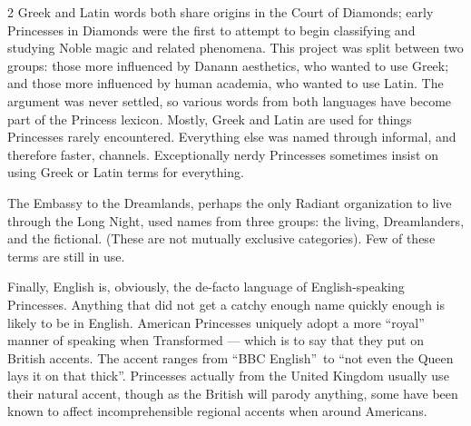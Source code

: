 \begin{multicols}{2}
Greek and Latin words both share origins in the Court of Diamonds; early Princesses in Diamonds were the first to attempt to begin classifying and studying Noble magic and related phenomena. This project was split between two groups: those more influenced by Danann aesthetics, who wanted to use Greek; and those more influenced by human academia, who wanted to use Latin. The argument was never settled, so various words from both languages have become part of the Princess lexicon. Mostly, Greek and Latin are used for things Princesses rarely encountered. Everything else was named through informal, and therefore faster, channels. Exceptionally nerdy Princesses sometimes insist on using Greek or Latin terms for everything.

The Embassy to the Dreamlands, perhaps the only Radiant organization to live through the Long Night, used names from three groups: the living, Dreamlanders, and the fictional. (These are not mutually exclusive categories). Few of these terms are still in use. 

Finally, English is, obviously, the de-facto language of English-speaking Princesses. Anything that did not get a catchy enough name quickly enough is likely to be in English. American Princesses uniquely adopt a more \textquotedblleft royal\textquotedblright\, manner of speaking when Transformed — which is to say that they put on British accents. The accent ranges from \textquotedblleft BBC English\textquotedblright\ to \textquotedblleft not even the Queen lays it on that thick\textquotedblright. Princesses actually from the United Kingdom usually use their natural accent, though as the British will parody anything, some have been known to affect incomprehensible regional accents when around Americans. 


\end{multicols}
